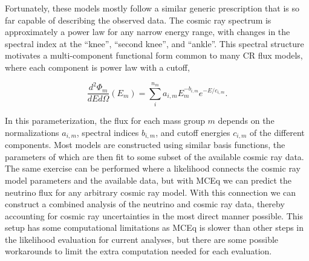 Fortunately, these models mostly follow a similar generic prescription that is so far capable of describing the observed data.
The cosmic ray spectrum is approximately a power law for any narrow energy range, with changes in the spectral index at the ``knee'', ``second knee'', and ``ankle''.
This spectral structure motivates a multi-component functional form common to many CR flux models, where each component is power law with a cutoff,
\begin{linenomath}
\begin{equation}
	\frac{d^2\Phi_m}{dEd\Omega}\left(E_m\right) = \sum_i^{n_m} a_{i,m} E_m^{-b_{i,m}} e^{-E/c_{i,m}}.
\end{equation}
	\label{eq:cr_spectrum}
\end{linenomath}
In this parameterization, the flux for each mass group $m$ depends on the normalizations $a_{i,m}$, spectral indices $b_{i,m}$, and cutoff energies $c_{i,m}$ of the different components.
Most models are constructed using similar basis functions, the parameters of which are then fit to some subset of the available cosmic ray data.
The same exercise can be performed where a likelihood connects the cosmic ray model parameters and the available data, but with MCEq we can predict the neutrino flux for any arbitrary cosmic ray model.
With this connection we can construct a combined analysis of the neutrino and cosmic ray data, thereby accounting for cosmic ray uncertainties in the most direct manner possible.
This setup has some computational limitations as MCEq is slower than other steps in the likelihood evaluation for current analyses, but there are some possible workarounds to limit the extra computation needed for each evaluation.

